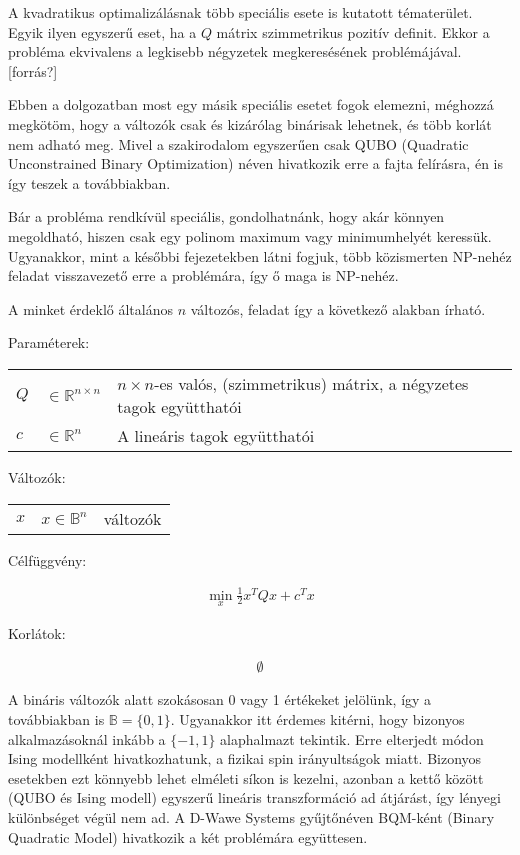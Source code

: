 A kvadratikus optimalizálásnak több speciális esete is kutatott tématerület. Egyik ilyen egyszerű eset, ha a $Q$ mátrix szimmetrikus pozitív definit. Ekkor a probléma ekvivalens a legkisebb négyzetek megkeresésének problémájával. [forrás?]

Ebben a dolgozatban most egy másik speciális esetet fogok elemezni, méghozzá megkötöm, hogy a változók csak és kizárólag binárisak lehetnek, és több korlát nem adható meg. Mivel a szakirodalom egyszerűen csak QUBO (Quadratic Unconstrained Binary Optimization) néven hivatkozik erre a fajta felírásra\cite{enwiki:1020700695}\cite{DWaveOceanBQM}, én is így teszek a továbbiakban.

Bár a probléma rendkívül speciális, gondolhatnánk, hogy akár könnyen megoldható, hiszen csak egy polinom maximum vagy minimumhelyét keressük. Ugyanakkor, mint a későbbi fejezetekben látni fogjuk, több közismerten NP-nehéz feladat visszavezető erre a problémára, így ő maga is NP-nehéz. 

A minket érdeklő általános $n$ változós, feladat így a következő alakban írható.


Paraméterek:

\begin{tabular}{lll}
	$Q$ & $\in \mathbb{R}^{n×n}$  & $n × n$-es valós, (szimmetrikus) mátrix, a négyzetes tagok együtthatói \\
	$c$ & $\in \mathbb{R}^n$   & A lineáris tagok együtthatói \\
\end{tabular}

Változók:

\begin{tabular}{lll}
	$x$ & $x \in \mathbb{B}^n$ & változók \\
\end{tabular}

Célfüggvény:

\begin{align}
	\min_{x} \frac{1}{2} x^T Q x + c^T x 
\end{align}

Korlátok:

\begin{align}
	\emptyset
\end{align}

A bináris változók alatt szokásosan 0 vagy 1 értékeket jelölünk, így a továbbiakban is $\mathbb{B}=\{0,1\}$. Ugyanakkor itt érdemes kitérni, hogy bizonyos alkalmazásoknál inkább a $\{-1,1\}$ alaphalmazt tekintik. Erre elterjedt módon Ising modellként hivatkozhatunk, a fizikai spin irányultságok miatt. Bizonyos esetekben ezt könnyebb lehet elméleti síkon is kezelni, azonban a kettő között (QUBO és Ising modell) egyszerű lineáris transzformáció ad átjárást, így lényegi különbséget végül nem ad. A D-Wawe Systems gyűjtőnéven BQM-ként (Binary Quadratic Model) hivatkozik a két problémára együttesen\cite{DWaveOceanBQM}.

